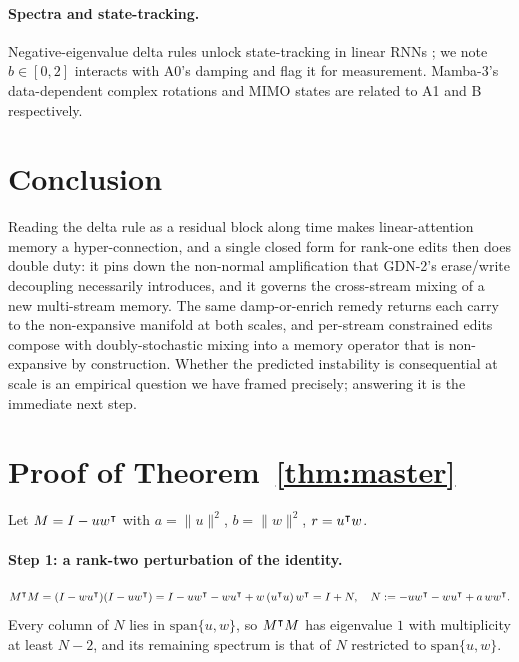 \documentclass[11pt,letterpaper,logo]{yalearxiv}
\begin{document}
\paragraph{Spectra and state-tracking.} Negative-eigenvalue delta rules unlock
state-tracking in linear RNNs \citep{grazzi2025statetracking}; we note $b\in[0,2]$ interacts
with A0's damping and flag it for measurement. Mamba-3's data-dependent complex rotations
and MIMO states are related to A1 and B respectively.


\section{Conclusion}
\label{sec:conclusion}

Reading the delta rule as a residual block along time makes linear-attention memory a
hyper-connection, and a single closed form for rank-one edits then does double duty: it
pins down the non-normal amplification that GDN-2's erase/write decoupling necessarily
introduces, and it governs the cross-stream mixing of a new multi-stream memory. The same
damp-or-enrich remedy returns each carry to the non-expansive manifold at both scales, and
per-stream constrained edits compose with doubly-stochastic mixing into a memory operator
that is non-expansive by construction. Whether the predicted instability is consequential at
scale is an empirical question we have framed precisely; answering it is the immediate next
step.


\appendix
\section{Proof of Theorem~\ref{thm:master}}
\label{app:master}

Let $M = I - u w^{\intercal}$ with $a = \|u\|^2$, $b = \|w\|^2$, $r = u^{\intercal}w$.

\paragraph{Step 1: a rank-two perturbation of the identity.}
\begin{equation*}
  M^{\intercal}M = (I - w u^{\intercal})(I - u w^{\intercal})
           = I - u w^{\intercal} - w u^{\intercal} + w\,(u^{\intercal}u)\,w^{\intercal}
           = I + N,
  \quad N := -u w^{\intercal} - w u^{\intercal} + a\, w w^{\intercal}.
\end{equation*}
Every column of $N$ lies in $\mathrm{span}\{u,w\}$, so $M^{\intercal}M$ has eigenvalue $1$ with
multiplicity at least $N-2$, and its remaining spectrum is that of $N$ restricted to
$\mathrm{span}\{u,w\}$.
\end{document}
